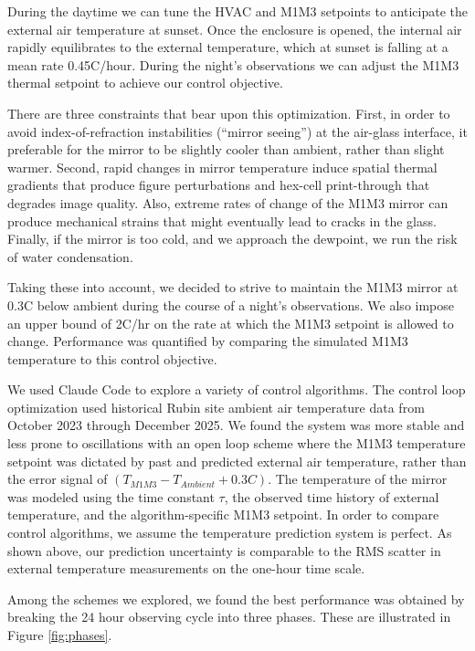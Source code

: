\documentclass[twocolumn]{aastex631}
\begin{document}
During the daytime we can tune the HVAC and M1M3 setpoints to anticipate the external air temperature at sunset. Once the enclosure is opened, the internal air rapidly equilibrates to the external temperature, which at sunset is falling at a mean rate 0.45C/hour. During the night's observations we can adjust the M1M3 thermal setpoint to achieve our control objective. 

There are three constraints that bear upon this optimization. First, in order to avoid index-of-refraction instabilities (``mirror seeing'') at the air-glass interface, it preferable for the mirror to be slightly cooler than ambient, rather than slight warmer. Second, rapid changes in mirror temperature induce spatial thermal gradients that produce figure perturbations and hex-cell print-through that degrades image quality. Also, extreme rates of change of the M1M3 mirror can produce mechanical strains that might eventually lead to cracks in the glass. Finally, if the mirror is too cold, and we approach the dewpoint, we run the risk of water condensation. 

Taking these into account, we decided to strive to maintain the M1M3 mirror at 0.3C below ambient during the course of a night's observations. We also impose an upper bound of 2C/hr on the rate at which the M1M3 setpoint is allowed to change. Performance was quantified by comparing the simulated M1M3 temperature to this control objective. 

We used Claude Code to explore a variety of control algorithms. The control loop optimization used historical Rubin site ambient air temperature data from October 2023 through December 2025. We found the system was more stable and less prone to oscillations with an open loop scheme where the M1M3 temperature setpoint was dictated by past and predicted external air temperature, rather than the error signal of $(T_{M1M3}-T_{Ambient}+0.3C)$.
The temperature of the mirror was modeled using the time constant $\tau$, the observed time history of external temperature, and the algorithm-specific M1M3 setpoint. In order to compare control algorithms, we assume the temperature prediction system is perfect. As shown above, our prediction uncertainty is comparable to the RMS scatter in external temperature measurements on the one-hour time scale. 


Among the schemes we explored, we found the best performance was obtained by breaking the 24 hour observing cycle into three phases. These are illustrated in Figure \ref{fig:phases}. 
\end{document}
